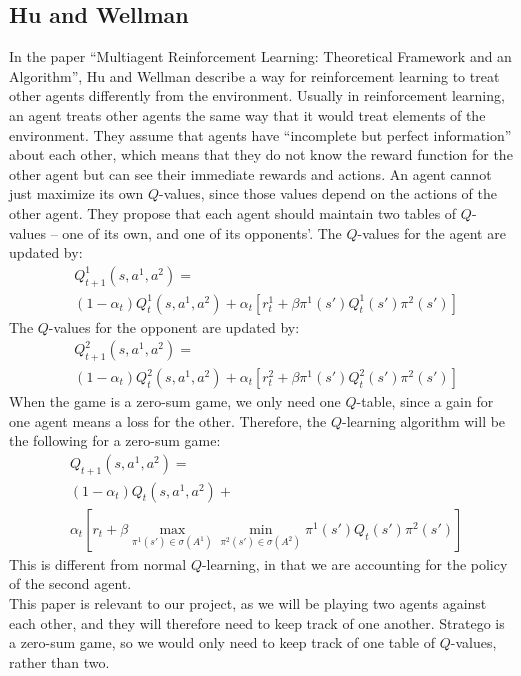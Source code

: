 \documentclass[letterpaper]{article}
\begin{document}
\subsection{Hu and Wellman}
In the paper ``Multiagent Reinforcement Learning: Theoretical Framework and an Algorithm'', Hu and Wellman describe a way for reinforcement learning to treat other agents differently from the environment. Usually in reinforcement learning, an agent treats other agents the same way that it would treat elements of the environment. They assume that agents have ``incomplete but perfect information'' about each other, which means that they do not know the reward function for the other agent but can see their immediate rewards and actions. An agent cannot just maximize its own $Q$-values, since those values depend on the actions of the other agent. They propose that each agent should maintain two tables of $Q$-values --  one of its own, and one of its opponents'. The $Q$-values for the agent are updated by:
\begin{align*}
&Q_{t+1}^1(s,a^1,a^2) = \\
&(1-\alpha_t)Q_t^1(s,a^1,a^2)+\alpha_t\left[r_t^1 +\beta \pi^1(s')Q_t^1(s') \pi^2(s')\right]
\end{align*}
The $Q$-values for the opponent are updated by:
\begin{align*}
&Q_{t+1}^2(s,a^1,a^2) = \\
&(1-\alpha_t)Q_t^2(s,a^1,a^2)+\alpha_t\left[r_t^2 +\beta \pi^1(s')Q_t^2(s') \pi^2(s')\right]
\end{align*}
When the game is a zero-sum game, we only need one $Q$-table, since a gain for one agent means a loss for the other. Therefore, the $Q$-learning algorithm will be the following for a zero-sum game: 
\begin{align*}
&Q_{t+1}(s,a^1,a^2) = \\
&(1-\alpha_t)Q_t(s,a^1,a^2)+\\
&\alpha_t\left[r_t +\beta \max_{\pi^1(s')\in\sigma(A^1)} \min_{\pi^2(s')\in \sigma(A^2)}\pi^1(s')Q_t(s') \pi^2(s')\right]
\end{align*}
This is different from normal $Q$-learning, in that we are accounting for the policy of the second agent.\\

This paper is relevant to our project, as we will be playing two agents against each other, and they will therefore need to keep track of one another. Stratego is a zero-sum game, so we would only need to keep track of one table of $Q$-values, rather than two.\\
\end{document}
